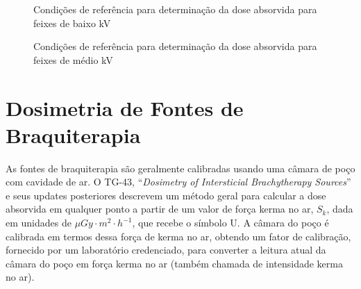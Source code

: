 \documentclass[11pt,a4paper]{article}
\begin{document}
	

	\begin{figure}[h]
		\centering
		\caption{Condições de referência para determinação da dose absorvida para feixes de baixo kV}
		\label{fig:condicoesReferenciaDosekv}
	\end{figure}

	\begin{figure}[h]
		\centering
		\caption{Condições de referência para determinação da dose absorvida para feixes de médio kV}
		\label{fig:condicoesReferenciaDoseMediokv}
	\end{figure}

\section{Dosimetria de Fontes de Braquiterapia}

	As fontes de braquiterapia são geralmente calibradas usando uma câmara de poço com cavidade de ar. O TG-43, ``\textit{Dosimetry of Intersticial Brachytherapy Sources}'' e seus updates posteriores descrevem um método geral para calcular a dose absorvida em qualquer ponto a partir de um valor de força kerma no ar, $S_k$, dada em  unidades de $\mu Gy \cdot m^2 \cdot h^{-1}$, que recebe o símbolo U. A câmara do poço é calibrada em termos dessa força de kerma no ar, obtendo um fator de calibração, fornecido por um laboratório credenciado, para converter a leitura atual da câmara do poço em força kerma no ar (também chamada de intensidade kerma no ar).
\end{document}

